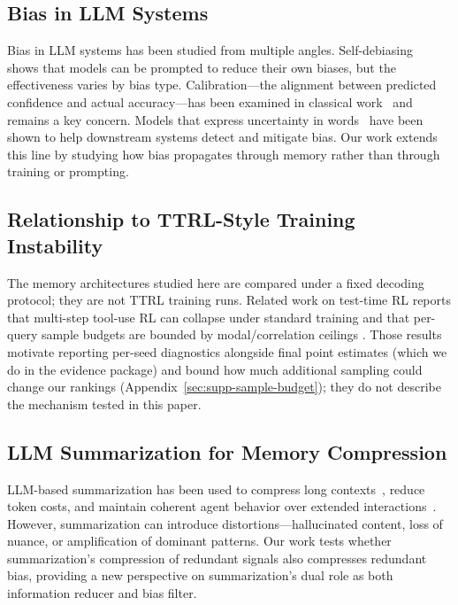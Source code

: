 \documentclass[11pt]{article}
\begin{document}
\subsection{Bias in LLM Systems}

Bias in LLM systems has been studied from multiple angles. Self-debiasing~\cite{schick2021debiasing} shows that models can be prompted to reduce their own biases, but the effectiveness varies by bias type. Calibration---the alignment between predicted confidence and actual accuracy---has been examined in classical work~\cite{guo2017calibration,kadavath2022language} and remains a key concern. Models that express uncertainty in words~\cite{lin2022teach} have been shown to help downstream systems detect and mitigate bias. Our work extends this line by studying how bias propagates through memory rather than through training or prompting.

\subsection{Relationship to TTRL-Style Training Instability}
The memory architectures studied here are compared under a fixed decoding protocol; they are not TTRL training runs. Related work on test-time RL reports that multi-step tool-use RL can collapse under standard training \citep{hao2026tooluse,liang2026mirage} and that per-query sample budgets are bounded by modal/correlation ceilings \citep{bay2026sampling}. Those results motivate reporting per-seed diagnostics alongside final point estimates (which we do in the evidence package) and bound how much additional sampling could change our rankings (Appendix~\ref{sec:supp-sample-budget}); they do not describe the mechanism tested in this paper.

\subsection{LLM Summarization for Memory Compression}

LLM-based summarization has been used to compress long contexts~\cite{liu2023lost}, reduce token costs, and maintain coherent agent behavior over extended interactions~\cite{wu2024memochat}. However, summarization can introduce distortions---hallucinated content, loss of nuance, or amplification of dominant patterns. Our work tests whether summarization's compression of redundant signals also compresses redundant bias, providing a new perspective on summarization's dual role as both information reducer and bias filter.
\end{document}
